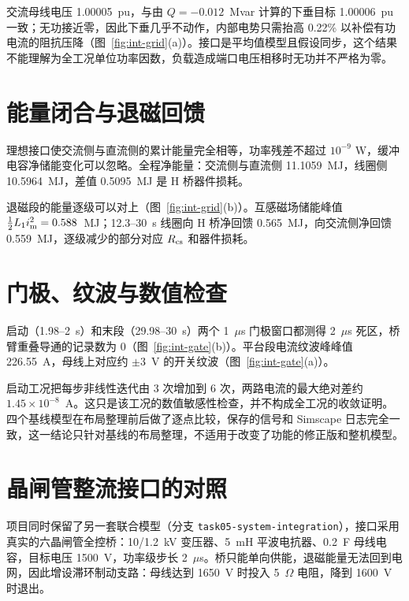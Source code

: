 交流母线电压 1.00005~pu，与由 $Q=-0.012$~Mvar 计算的下垂目标 1.00006~pu 一致；无功接近零，因此下垂几乎不动作，内部电势只需抬高 0.22\% 以补偿有功电流的阻抗压降（图~\ref{fig:int-grid}(a)）。接口是平均值模型且假设同步，这个结果不能理解为全工况单位功率因数，负载造成端口电压相移时无功并不严格为零。

\section{能量闭合与退磁回馈}

理想接口使交流侧与直流侧的累计能量完全相等，功率残差不超过 $10^{-9}$ W，缓冲电容净储能变化可以忽略。全程净能量：交流侧与直流侧 11.1059~MJ，线圈侧 10.5964~MJ，差值 0.5095~MJ 是 H 桥器件损耗。


退磁段的能量逐级可以对上（图~\ref{fig:int-grid}(b)）。互感磁场储能峰值 $\tfrac12L_1i_{\mathrm{m}}^2=0.588$~MJ；12.3--30~s 线圈向 H 桥净回馈 0.565~MJ，向交流侧净回馈 0.559~MJ，逐级减少的部分对应 $R_{\mathrm{cs}}$ 和器件损耗。

\section{门极、纹波与数值检查}

启动（1.98--2~s）和末段（29.98--30~s）两个 1~$\mu$s 门极窗口都测得 2~$\mu$s 死区，桥臂重叠导通的记录数为 0（图~\ref{fig:int-gate}(b)）。平台段电流纹波峰峰值 226.55~A，母线上对应约 $\pm3$~V 的开关纹波（图~\ref{fig:int-gate}(a)）。

启动工况把每步非线性迭代由 3 次增加到 6 次，两路电流的最大绝对差约 $1.45\times10^{-8}$~A。这只是该工况的数值敏感性检查，并不构成全工况的收敛证明。四个基线模型在布局整理前后做了逐点比较，保存的信号和 Simscape 日志完全一致，这一结论只针对基线的布局整理，不适用于改变了功能的修正版和整机模型。


\section{晶闸管整流接口的对照}

项目同时保留了另一套联合模型（分支 \texttt{task05-system-integration}），接口采用真实的六晶闸管全控桥：10/1.2~kV 变压器、5~mH 平波电抗器、0.2~F 母线电容，目标电压 1500~V，功率级步长 2~$\mu$s。桥只能单向供能，退磁能量无法回到电网，因此增设滞环制动支路：母线达到 1650~V 时投入 5~$\Omega$ 电阻，降到 1600~V 时退出。

